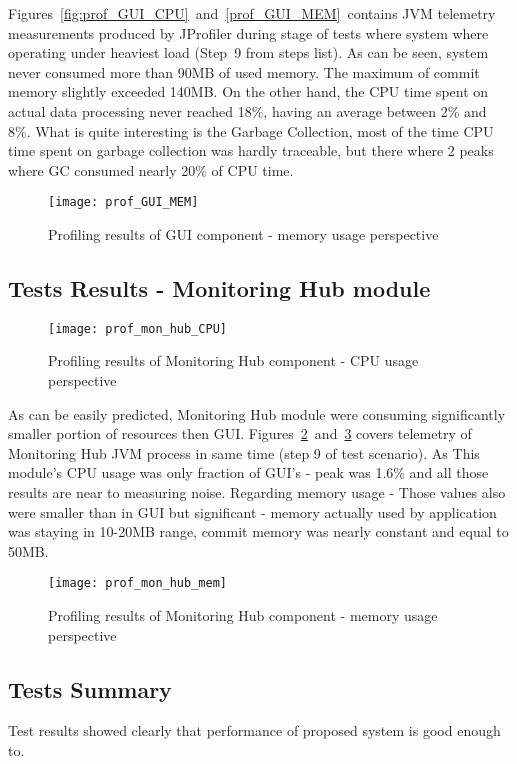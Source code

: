 Figures~\ref{fig:prof_GUI_CPU}~and~\ref{prof_GUI_MEM}~contains JVM telemetry measurements produced by JProfiler during stage of tests where system where operating under heaviest load (Step~9 from steps list). As can be seen, system never consumed more than 90MB of used memory. The maximum of commit memory slightly exceeded 140MB. On the other hand, the CPU time spent on actual data processing  never reached 18\%, having an average between 2\% and 8\%. What is quite interesting is the Garbage Collection, most of the time CPU time spent on garbage collection was hardly traceable, but there where 2 peaks where GC consumed nearly 20\% of CPU time. 


\begin{figure}[ht]
  \centering
  \texttt{[image: prof\_GUI\_MEM]}
  \caption{Profiling results of GUI component - memory usage perspective}
  \label{fig:prof_GUI_MEM}
\end{figure}

\subsection{Tests Results - Monitoring Hub module}

\begin{figure}[ht]
  \centering
  \texttt{[image: prof\_mon\_hub\_CPU]}
  \caption{Profiling results of Monitoring Hub component - CPU usage perspective}
  \label{fig:prof_mon_hub_CPU}
\end{figure}


As can be easily predicted, Monitoring Hub module were consuming significantly smaller portion of resources then GUI. Figures~\ref{fig:prof_mon_hub_CPU}~and~\ref{fig:prof_mon_hub_mem} covers telemetry of Monitoring Hub JVM process in same time (step 9 of test scenario). As This module\rq{}s CPU usage was only fraction of GUI\rq{}s - peak was 1.6\% and all those results are near to measuring noise. Regarding memory usage - Those values also were smaller than in GUI but significant - memory actually used by application was staying in 10-20MB range, commit memory was nearly constant and equal to 50MB.

\begin{figure}[ht]
  \centering
  \texttt{[image: prof\_mon\_hub\_mem]}
  \caption{Profiling results of Monitoring Hub component - memory usage perspective}
  \label{fig:prof_mon_hub_mem}
\end{figure}

\subsection{Tests Summary}

Test results showed clearly that performance of proposed system is good enough to. 
